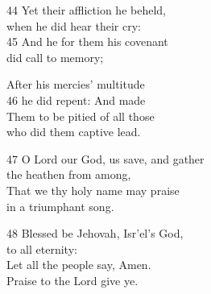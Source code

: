 44 Yet their affliction he beheld,\\
when he did hear their cry:\\
45 And he for them his covenant\\
did call to memory;

After his mercies’ multitude\\
46 he did repent: And made\\
Them to be pitied of all those\\
who did them captive lead.

47 O Lord our God, us save, and gather\\
the heathen from among,\\
That we thy holy name may praise\\
in a triumphant song.

48 Blessed be Jehovah, Isr’el’s God,\\
to all eternity:\\
Let all the people say, Amen.\\
Praise to the Lord give ye.

\begin{center}
\quad{}\quad{}
\end{center}



